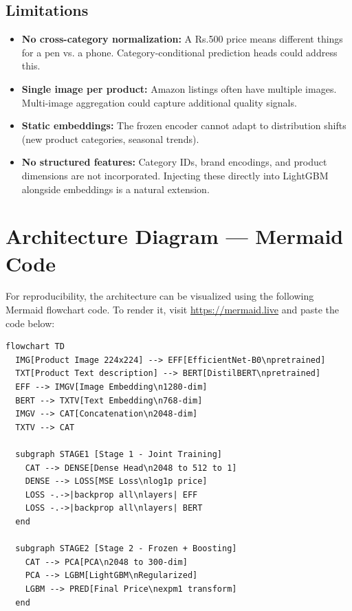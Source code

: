 \documentclass[conference]{IEEEtran}
\begin{document}
\subsection{Limitations}
\begin{itemize}
    \item \textbf{No cross-category normalization:} A Rs.500 price means different things for a pen vs. a phone. Category-conditional prediction heads could address this.
    \item \textbf{Single image per product:} Amazon listings often have multiple images. Multi-image aggregation could capture additional quality signals.
    \item \textbf{Static embeddings:} The frozen encoder cannot adapt to distribution shifts (new product categories, seasonal trends).
    \item \textbf{No structured features:} Category IDs, brand encodings, and product dimensions are not incorporated. Injecting these directly into LightGBM alongside embeddings is a natural extension.
\end{itemize}

\section{Architecture Diagram — Mermaid Code}

For reproducibility, the architecture can be visualized using the following Mermaid flowchart code. To render it, visit \url{https://mermaid.live} and paste the code below:

\begin{verbatim}
flowchart TD
  IMG[Product Image 224x224] --> EFF[EfficientNet-B0\npretrained]
  TXT[Product Text description] --> BERT[DistilBERT\npretrained]
  EFF --> IMGV[Image Embedding\n1280-dim]
  BERT --> TXTV[Text Embedding\n768-dim]
  IMGV --> CAT[Concatenation\n2048-dim]
  TXTV --> CAT

  subgraph STAGE1 [Stage 1 - Joint Training]
    CAT --> DENSE[Dense Head\n2048 to 512 to 1]
    DENSE --> LOSS[MSE Loss\nlog1p price]
    LOSS -.->|backprop all\nlayers| EFF
    LOSS -.->|backprop all\nlayers| BERT
  end

  subgraph STAGE2 [Stage 2 - Frozen + Boosting]
    CAT --> PCA[PCA\n2048 to 300-dim]
    PCA --> LGBM[LightGBM\nRegularized]
    LGBM --> PRED[Final Price\nexpm1 transform]
  end
\end{verbatim}
\end{document}
